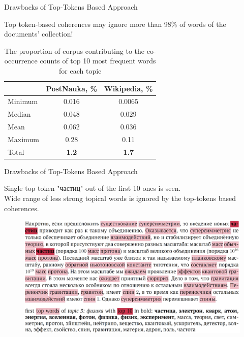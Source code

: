 \documentclass[russian]{beamer}
\begin{document}
\begin{frame}{Drawbacks of Top-Tokens Based Approach}
  \begin{block}{}
    Top token-based coherences may ignore more than 98\% of words of the documents' collection!
  \end{block}
  
  \bigskip
  
  \begin{table}[h]
    \centering
    \captionsetup{justification=centering}
    
    \begin{tabular}{lcc}
      {} & PostNauka, \% & Wikipedia, \%\\
      \midrule
      Minimum & 0.016 & 0.0065\\
      Median & 0.048 & 0.029\\
      Mean & 0.062 & 0.036\\
      Maximum & 0.28 & 0.11\\
      \midrule
      Total & \textbf{1.2} & \textbf{1.7}
    \end{tabular}
    
    \caption*{The proportion of corpus contributing to the co-occurrence counts of top 10 most frequent words for each topic}
  \end{table}
\end{frame}


\begin{frame}{Drawbacks of Top-Tokens Based Approach}
  \begin{block}{}
    Single top token "частиц" out of the first 10 ones is seen.\\
    Wide range of less strong topical words is ignored by the top-tokens based coherences.
  \end{block}
  
  \begin{figure}[h]
    \centering
    \includegraphics[width=1.0\textwidth]{topwords-insufficient.jpg}
  \end{figure}
\end{frame}
\end{document}

